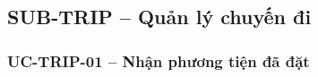 \newcommand{\TRIPDiagramFigure}[3]{%
  \begingroup
  \setlength{\intextsep}{0pt}
  \InsertArtifact[0.90\textheight]{#1}{#2}{#3}{}
  \endgroup
}

\subsection{SUB-TRIP -- Quản lý chuyến đi}


\subsubsection{UC-TRIP-01 -- Nhận phương tiện đã đặt}


